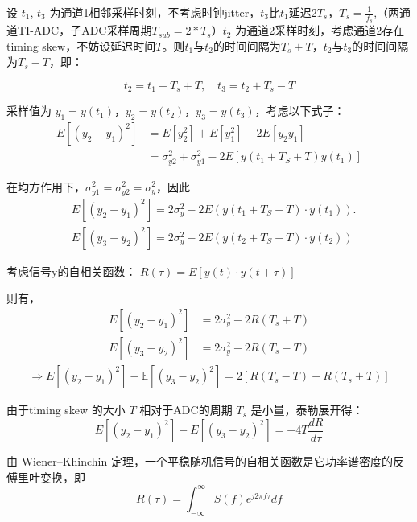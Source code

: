 \documentclass[cs4size,a4paper]{ctexart}
\numberwithin{equation}{section}
\numberwithin{table}{section}
\numberwithin{figure}{section}
\begin{document}
		
		设 $t_1$, $t_3$ 为通道1相邻采样时刻，不考虑时钟jitter，$t_3$比$t_1$延迟2$T_s$，$T_s=\frac{1}{f
		_s}$,（两通道TI-ADC，子ADC采样周期$T_{sub}=2*T_s$）$t_2$ 为通道2采样时刻，考虑通道2存在timing skew，不妨设延迟时间$T$。则$t_1$与$t_2$的时间间隔为$T_s+T$，$t_2$与$t_3$的时间间隔为$T_s-T$，即：
		
		\[
		t_2 = t_1 + T_s + T,\quad t_3 = t_2 + T_s - T
		\]
		
		采样值为 $y_1 = y(t_1)$，$y_2 = y(t_2)$，$y_3 = y(t_3)$，考虑以下式子：
		\begin{equation}
			\begin{aligned}
				E\left[\left(y_2-y_1\right)^2\right] & =E\left[y_2^2\right]+E\left[y_1^2\right]-2 E\left[y_2 y_1\right] \\
				& =\sigma_{y 2}^2+\sigma_{y 1}^2-2 E\left[y\left(t_1+T_S+T\right) y\left(t_1\right)\right]
			\end{aligned}
		\end{equation}
		
		在均方作用下，$\sigma_{y 1}^2=\sigma_{y 2}^2=\sigma_{y}^2$，因此
		\begin{equation}
			\begin{aligned}
				&E\left[\left(y_2-y_1\right)^2\right]=2 \sigma_y^2-2 E\left(y(t_1+T_S+T) \cdot y(t_1) \right) .\\
				&E\left[\left(y_3-y_2\right)^2\right]=2 \sigma_y^2-2 E\left(y(t_2+T_S-T) \cdot y(t_2)\right)
			\end{aligned}
		\end{equation}
		
		考虑信号y的自相关函数：
		$R(\tau)=E[y(t) \cdot y(t+\tau)]$
		
		则有，
		\begin{align*}
			E[(y_2 - y_1)^2] &= 2\sigma_y^2 - 2R(T_s + T) \\
			E[(y_3 - y_2)^2] &= 2\sigma_y^2 - 2R(T_s - T)
		\end{align*}
		\begin{align*}
			\Rightarrow E[(y_2 - y_1)^2] - \mathbb{E}[(y_3 - y_2)^2] = 2\left[ R(T_s - T) - R(T_s + T) \right]
		\end{align*}
		
		
		
		由于timing skew 的大小 $T$ 相对于ADC的周期 $T_s$ 是小量，泰勒展开得：
		\[
		E[(y_2 - y_1)^2] - E[(y_3 - y_2)^2] = -4T \dfrac{d R}{d \tau}
		\]
		
		由 Wiener–Khinchin 定理，一个平稳随机信号的自相关函数是它功率谱密度的反傅里叶变换，即
		\[
		R(\tau) = \int_{-\infty}^{\infty}   S(f) e^{j2\pi f\tau} df
		\]
		
\end{document}
